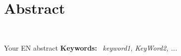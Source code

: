 \thispagestyle{empty} %
\begin{latin} %
‎\chapter*{Abstract}‎
\begin{spacing}{1.5}
\noindent 
Your EN abstract
\vskip 1cm
\noindent \textbf{Keywords:} \
\textit{keyword1, KeyWord2, ...}‎
\end{spacing}
\end{latin}

